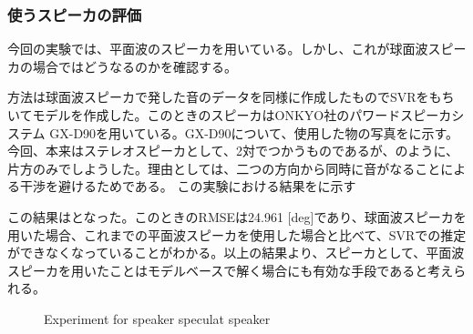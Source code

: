 \clearpage

\subsubsection{使うスピーカの評価}
\label{sec:result_svr_speaker}
今回の実験では、平面波のスピーカを用いている。しかし、これが球面波スピーカの場合ではどうなるのかを確認する。

方法は球面波スピーカで発した音のデータを同様に作成したものでSVRをもちいてモデルを作成した。このときのスピーカはONKYO社のパワードスピーカシステム GX-D90を用いている。GX-D90について、使用した物の写真をに示す。今回、本来はステレオスピーカとして、2対でつかうものであるが、のように、片方のみでしようした。理由としては、二つの方向から同時に音がなることによる干渉を避けるためである。
この実験における結果をに示す

この結果はとなった。このときのRMSEは24.961 [deg]であり、球面波スピーカを用いた場合、これまでの平面波スピーカを使用した場合と比べて、SVRでの推定ができなくなっていることがわかる。以上の結果より、スピーカとして、平面波スピーカを用いたことはモデルベースで解く場合にも有効な手段であると考えられる。

\begin{figure}[ht]
    \centering
    \caption{Experiment for speaker speculat speaker}
    \label{fig:beam_check}
\end{figure}

